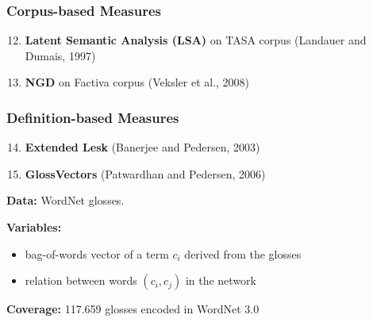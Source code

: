 \documentclass{beamer}
\begin{document}


	

	

\begin{frame}
\frametitle{Corpus-based Measures }

\begin{enumerate}
   \setcounter{enumi}{11}
	\item \textbf{Latent Semantic Analysis (LSA)} on TASA corpus (Landauer and Dumais, 1997)
	\item \textbf{NGD} on Factiva corpus (Veksler et al., 2008)
\end{enumerate}
	
\end{frame}

\begin{frame}
\frametitle{Definition-based Measures}

\begin{enumerate}
  \setcounter{enumi}{13}
  \item \textbf{Extended Lesk}  (Banerjee and Pedersen, 2003)
  \item \textbf{GlossVectors} (Patwardhan and Pedersen, 2006)
\end{enumerate}


\textbf{Data:} WordNet glosses.
	
\textbf{Variables:}
\begin{itemize}
		\item bag-of-words vector of a term $c_i$ derived from the glosses
		\item relation  between words $(c_i,c_j)$ in the network 
\end{itemize}

\textbf{Coverage:} 117.659 glosses encoded in WordNet 3.0

\end{frame}
\end{document}
